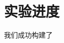 \documentclass[a4paper, 10pt]{article}
\begin{document}
	\section{实验进度}
		我们成功构建了	
	
		\renewcommand{\refname}{References}
		
		
			
			
			
			
			
			
		
		
		
		
		
	
\end{document}
